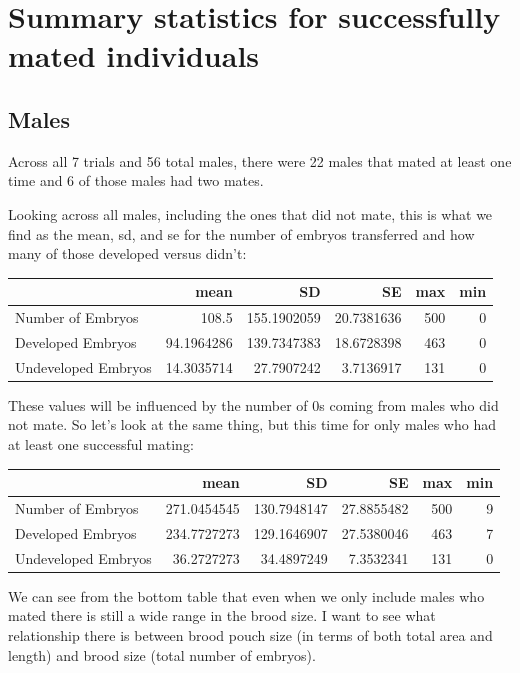\documentclass[
]{article}
\begin{document}
\hypertarget{summary-statistics-for-successfully-mated-individuals}{%
\section{Summary statistics for successfully mated individuals}\label{summary-statistics-for-successfully-mated-individuals}}

\hypertarget{males}{%
\subsection{Males}\label{males}}

Across all 7 trials and 56 total males, there were 22 males that mated at least one time and 6 of those males had two mates.

Looking across all males, including the ones that did not mate, this is what we find as the mean, sd, and se for the number of embryos transferred and how many of those developed versus didn't:

\begin{longtable}[]{@{}lrrrrr@{}}
\toprule\noalign{}
& mean & SD & SE & max & min \\
\midrule\noalign{}
\endhead
\bottomrule\noalign{}
\endlastfoot
Number of Embryos & 108.5 & 155.1902059 & 20.7381636 & 500 & 0 \\
Developed Embryos & 94.1964286 & 139.7347383 & 18.6728398 & 463 & 0 \\
Undeveloped Embryos & 14.3035714 & 27.7907242 & 3.7136917 & 131 & 0 \\
\end{longtable}

These values will be influenced by the number of 0s coming from males who did not mate. So let's look at the same thing, but this time for only males who had at least one successful mating:

\begin{longtable}[]{@{}lrrrrr@{}}
\toprule\noalign{}
& mean & SD & SE & max & min \\
\midrule\noalign{}
\endhead
\bottomrule\noalign{}
\endlastfoot
Number of Embryos & 271.0454545 & 130.7948147 & 27.8855482 & 500 & 9 \\
Developed Embryos & 234.7727273 & 129.1646907 & 27.5380046 & 463 & 7 \\
Undeveloped Embryos & 36.2727273 & 34.4897249 & 7.3532341 & 131 & 0 \\
\end{longtable}

We can see from the bottom table that even when we only include males who mated there is still a wide range in the brood size. I want to see what relationship there is between brood pouch size (in terms of both total area and length) and brood size (total number of embryos).
\end{document}
